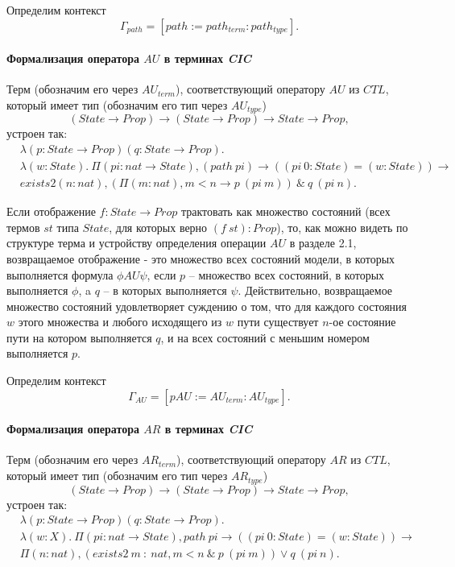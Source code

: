 \documentclass[12pt]{article}
\begin{document}
Определим контекст $$\Gamma_{path} = [path:=path_{term}:path_{type}].$$

\paragraph{Формализация оператора $AU$ в терминах \textit{CIC}}\mbox{}

Терм (обозначим его через $AU_{term}$), соответствующий оператору $AU$ из $CTL$, который имеет тип (обозначим его тип через $AU_{type}$) 
$$ (State \xrightarrow{} Prop) \xrightarrow{} (State \xrightarrow{} Prop) \xrightarrow{} State \xrightarrow{} Prop,$$
устроен так:
\begin{align*}
&\lambda (p : State \xrightarrow{} Prop)(q : State \xrightarrow{} Prop). \\ & \lambda(w : State).\ \Pi (pi : nat \xrightarrow{} State), (path\ pi) \xrightarrow{} ((pi\ 0:State) = (w:State)) \xrightarrow{} \\ 
& exists2 (n : nat), (\Pi (m : nat), m < n \xrightarrow{} p\ (pi\ m))\ \&\ q\ (pi\ n).
\end{align*}

Если отображение $f : State \xrightarrow{} Prop$ трактовать как множество состояний (всех термов $st$ типа $State$, для которых верно $(f\ st) : Prop$), то, как можно видеть по структуре терма и устройству определения операции $AU$ в разделе 2.1, возвращаемое отображение - это множество всех состояний модели, в которых выполняется формула $\phi AU \psi$, если $p$ -- множество всех состояний, в которых выполняется $\phi$, a $q$ -- в которых выполняется $\psi$.
Действительно, возвращаемое множество состояний удовлетворяет суждению о том, что для каждого состояния $w$ этого множества и любого  исходящего из $w$ пути существует $n$-ое состояние пути на котором выполняется $q$, и на всех состояний с меньшим номером выполняется $p$.

Определим контекст $$\Gamma_{AU} = [pAU:=AU_{term}:AU_{type}].$$

\paragraph{Формализация оператора $AR$ в терминах \textit{CIC}}\mbox{}

Терм (обозначим его через $AR_{term}$), соответствующий оператору $AR$ из $CTL$, который имеет тип (обозначим его тип через $AR_{type}$) 
$$(State \xrightarrow{} Prop) \xrightarrow{} (State \xrightarrow{} Prop) \xrightarrow{} State \xrightarrow{} Prop,$$
устроен так:
\begin{align*}
& \lambda(p : State \xrightarrow{} Prop)(q : State \xrightarrow{} Prop).\\ 
& \lambda (w : X).\ \Pi (pi : nat \xrightarrow{} State), path\ pi \xrightarrow{} ((pi\ 0:State) = (w:State)) \xrightarrow{} \\
& \Pi (n : nat),(exists2\ m\ :\ nat, m < n\ \& \ p\ (pi\ m)) \lor q\ (pi\ n).
\end{align*}
\end{document}
